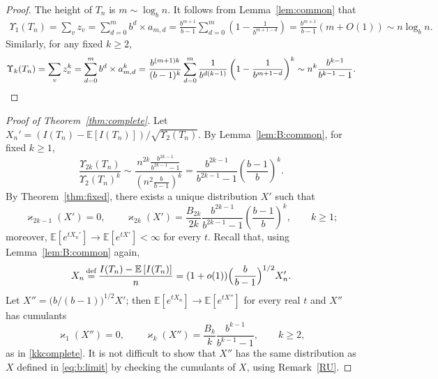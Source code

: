 \documentclass[11pt]{article}
\newcommand{\E}[1]{\mathbb{E} \left[#1\right]}
\numberwithin{theorem}{section}
\theoremstyle{definition}
\newcommand{\eqd}{\,{\buildrel {\mathrm{def}} \over =}\,}
\numberwithin{equation}{section}
\newcommand{\refT}[1]{Theorem~\ref{#1}}
\newcommand{\refL}[1]{Lemma~\ref{#1}}
\newcommand{\refR}[1]{Remark~\ref{#1}}
\newcommand\kk{\varkappa}
\newcommand\bigpar[1]{\bigl(#1\bigr)}
\newcommand\Bigpar[1]{\Bigl(#1\Bigr)}
\begin{document}
\begin{proof}
The height of \(T_n\) is  \(m \sim \log_b n \).
    It follows from \refL{lem:common} that
    \begin{align*}
        \Upsilon_{1}(T_n) 
        = 
        \sum_{v} z_v
        =
        \sum_{d=0}^{m} b^{d} 
        \times
        a_{m,d}
        =
        \frac{b^{m+1}}{b-1}
        \sum_{d=0}^{m} \left( 1 - \frac{1}{b^{m+1-d}} \right)
        =
        \frac{b^{m+1}}{b-1}
        \left( m + O(1) \right)
        \sim n \log_{b}n
        .
    \end{align*}
    Similarly, for any fixed \(k \ge 2\),
    \[
        \Upsilon_{k}(T_n) 
        = 
        \sum_{v} z_v^{k}
        =
        \sum_{d=0}^{m} b^{d} %
        \times a_{m,d}^{k}
        =
        \frac{b^{(m+1)k}}{(b-1)^{k}}
        \sum_{d=0}^{m} \frac{1}{b^{d(k-1)}} \left(1 - \frac{1}{b^{m+1-d}} \right)^{k}
        \sim
        n^{k} \frac{b^{k-1}}{b^{k-1}-1}
        .
        \qedhere
    \]
\end{proof}

\begin{proof}[Proof of {\refT{thm:complete}}]
    Let \(X_n' = (I(T_n)-\E{I(T_n)})/\sqrt{\Upsilon_2(T_n)}\).
    By \refL{lem:B:common}, for fixed \(k \ge 1\),
    \[
        \frac{\Upsilon_{2k}(T_{n})}{\Upsilon_{2}(T_n)^k}
        \sim
        \frac{n^{2k}\frac{b^{2k-1}}{b^{2k-1}-1}}{\left(n^2\frac{b}{b-1}\right)^{k}}
=
        \frac{b^{2k-1}}{b^{2k-1}-1} \left( \frac{b-1}{b} \right)^{k}.
    \]
    By \refT{thm:fixed}, there exists a unique distribution \(X'\) such that
    \[
        \kk_{2k-1}(X') = 0, 
        \qquad
        \kk_{2k}(X') = 
        \frac{B_{2k}}{2k}
        \frac{b^{2k-1}}{b^{2k-1}-1} \left( \frac{b-1}{b} \right)^{k},
        \qquad
        k \ge 1;
    \]
moreover, \(\E{e^{tX_n'}} \to \E{e^{tX'}}<\infty\) for every $t$.
Recall that,
using \refL{lem:B:common} again,
\[
        X_n \eqd \frac{I(T_n)-\E{I(T_n)}}{n} 
= (1+o(1)) \Bigpar{\frac{b}{b-1}}^{1/2} X_n'.
    \]
    Let \(X'' = \bigpar{b/(b-1)}^{1/2}X'\);
then \(\E{e^{tX_n}} \to \E{e^{tX''}}\) for
    every real $t$ and
    \(X''\) has cumulants
\[
        \kk_{1}(X'') = 0, 
        \qquad
        \kk_{k}(X'') = 
        \frac{B_k}{k}
        \frac{b^{k-1}}{b^{k-1}-1},
        \qquad
        k \ge 2,
    \]
    as in \eqref{kkcomplete}. 
It is not difficult to show that \(X''\) has the same distribution as \(X\)
defined  in \eqref{eq:b:limit} by checking the cumulants of \(X\), using
\refR{RU}.
\end{proof}
\end{document}
